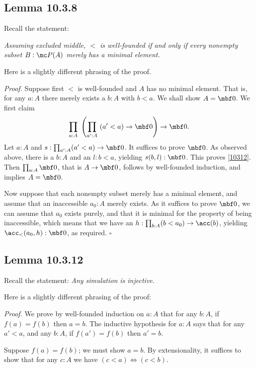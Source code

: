 \documentclass[12pt]{article}
\begin{document}

\subsection{Lemma 10.3.8}

Recall the statement: 

\nn\emph{Assuming excluded middle, $<$ is well-founded if and only if every nonempty subset $B:\mc P(A)$ merely has a minimal element.} 

Here is a slightly different phrasing of the proof.

\nn\emph{Proof.} Suppose first $<$ is well-founded and $A$ has no minimal element. That is, for any $a:A$ there merely exists a $b:A$ with $b<a$. We shall show $A=\mbf0$. We first claim 
\begin{equation}\label{10312}
\prod_{a:A}\ \left(\prod_{a':A}\ (a'<a)\to\mbf0\right)\to\mbf0.
\end{equation}
Let $a:A$ and $s:\prod_{a':A}(a'<a)\to\mbf0$. It suffices to prove $\mbf0$. As observed above, there is a $b:A$ and an $l:b<a$, yielding $s(b,l):\mbf0$. This proves \eqref{10312}. Then $\prod_{a:A}\mbf0$, that is $A\to\mbf0$, follows by well-founded induction, and implies $A=\mbf0$. 

Now suppose that each nonempty subset merely has a minimal element, and assume that an inaccessible $a_0:A$ merely exists. As it suffices to prove $\mbf0$, we can assume that $a_0$ exists purely, and that it is minimal for the property of being inaccessible, which means that we have an $h:\prod_{b:A}(b<a_0)\to\acc(b)$, yielding $\acc_<(a_0,h):\mbf0$, as required. $\square$


\subsection{Lemma 10.3.12}

Recall the statement: \emph{Any simulation is injective}.

Here is a slightly different phrasing of the proof:

\nn\emph{Proof.} We prove by well-founded induction on $a:A$ that for any $b:A$, if $f(a)=f(b)$ then $a=b$. The inductive hypothesis for $a:A$ says that for any $a'<a$, and any $b:A$, if $f(a')=f(b)$ then $a'=b$.

Suppose $f(a)=f(b)$; we must show $a=b$. By extensionality, it suffices to show that for any $c:A$ we have $(c<a)\Leftrightarrow(c<b)$. 
\end{document}
